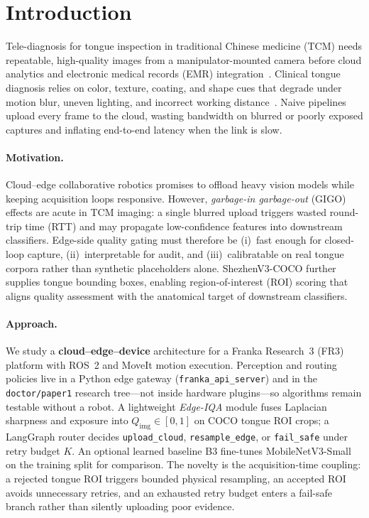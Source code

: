\section{Introduction}
\label{sec:intro}

Tele-diagnosis for tongue inspection in traditional Chinese medicine (TCM) needs repeatable, high-quality images from a manipulator-mounted camera before cloud analytics and electronic medical records (EMR) integration~\cite{zhang2020tongue,qi2016tongue}.
Clinical tongue diagnosis relies on color, texture, coating, and shape cues that degrade under motion blur, uneven lighting, and incorrect working distance~\cite{zhang2020tongue}.
Naive pipelines upload every frame to the cloud, wasting bandwidth on blurred or poorly exposed captures and inflating end-to-end latency when the link is slow.

\paragraph{Motivation.}
Cloud--edge collaborative robotics promises to offload heavy vision models while keeping acquisition loops responsive.
However, \emph{garbage-in garbage-out} (GIGO) effects are acute in TCM imaging: a single blurred upload triggers wasted round-trip time (RTT) and may propagate low-confidence features into downstream classifiers.
Edge-side quality gating must therefore be (i)~fast enough for closed-loop capture, (ii)~interpretable for audit, and (iii)~calibratable on real tongue corpora rather than synthetic placeholders alone.
ShezhenV3-COCO further supplies tongue bounding boxes, enabling region-of-interest (ROI) scoring that aligns quality assessment with the anatomical target of downstream classifiers.

\paragraph{Approach.}
We study a \textbf{cloud--edge--device} architecture for a Franka Research~3 (FR3) platform with ROS~2 and MoveIt motion execution.
Perception and routing policies live in a Python edge gateway (\texttt{franka\_api\_server}) and in the \texttt{doctor/paper1} research tree---not inside hardware plugins---so algorithms remain testable without a robot.
A lightweight \emph{Edge-IQA} module fuses Laplacian sharpness and exposure into $Q_{\mathrm{img}}\in[0,1]$ on COCO tongue ROI crops; a LangGraph router decides \texttt{upload\_cloud}, \texttt{resample\_edge}, or \texttt{fail\_safe} under retry budget $K$.
An optional learned baseline B3 fine-tunes MobileNetV3-Small on the training split for comparison.
The novelty is the acquisition-time coupling: a rejected tongue ROI triggers bounded physical resampling, an accepted ROI avoids unnecessary retries, and an exhausted retry budget enters a fail-safe branch rather than silently uploading poor evidence.

